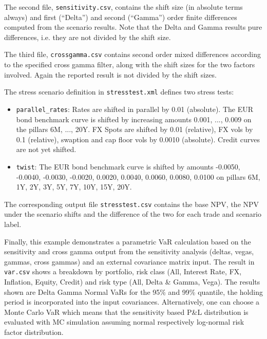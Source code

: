 \documentclass[12pt, a4paper]{article}
\begin{document}
The second file, {\tt sensitivity.csv}, contains the shift size (in absolute terms always) and first (``Delta'') and second
(``Gamma'') order finite differences computed from the scenario results. Note that the Delta and Gamma results pure
differences, i.e. they are not divided by the shift size.

The third file, {\tt crossgamma.csv} contains second order mixed differences according to the specified cross gamma
filter, along with the shift sizes for the two factors involved. Again the reported result is not divided by the shift
sizes.

The stress scenario definition in {\tt stresstest.xml} defines two stress tests:

\begin{itemize}
\item {\tt parallel\_rates}: Rates are shifted in parallel by 0.01 (absolute). The EUR bond benchmark curve is shifted by
  increasing amounts 0.001, ..., 0.009 on the pillars 6M, ..., 20Y. FX Spots are shifted by 0.01 (relative), FX vols by
  0.1 (relative), swaption and cap floor vols by 0.0010 (absolute).
  Credit curves are not yet shifted.
\item {\tt twist}: The EUR bond benchmark curve is shifted by amounts -0.0050, -0.0040, -0.0030, -0.0020, 0.0020,
  0.0040, 0.0060, 0.0080, 0.0100 on pillars 6M, 1Y, 2Y, 3Y, 5Y, 7Y, 10Y, 15Y, 20Y.
\end{itemize}

The corresponding output file {\tt stresstest.csv} contains the base NPV, the NPV under the scenario shifts and the
difference of the two for each trade and scenario label.

\medskip
Finally, this example demonstrates a parametric VaR calculation based on the sensitivity and cross gamma output from the sensitivity analysis (deltas, vegas, gammas, cross gammas) and an external covariance matrix input. The result in {\tt var.csv} shows a breakdown by portfolio, risk class (All, Interest Rate, FX, Inflation, Equity, Credit) and risk type (All, Delta \& Gamma, Vega). The results shown are Delta Gamma Normal VaRs for the 95\% and 99\% quantile, the holding period is incorporated into the input covariances. Alternatively, one can choose a Monte Carlo VaR which means that the sensitivity based P\&L distribution is evaluated with MC simulation assuming normal respectively log-normal risk factor distribution. 
 
\end{document}
